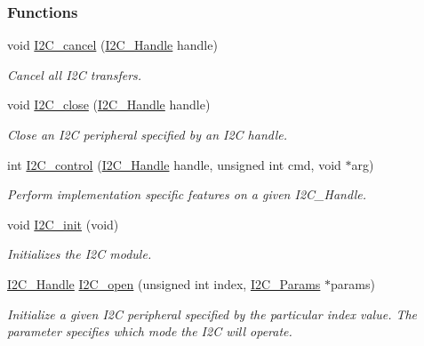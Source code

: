 \subsubsection*{Functions}
\begin{DoxyCompactItemize}
\item 
void \hyperlink{_i2_c_8h_a8cad0c04a9eca0fffc0ffe5586a5179b}{I2\+C\+\_\+cancel} (\hyperlink{_i2_c_8h_a5809a229f8395c87f59e63128195c1bf}{I2\+C\+\_\+\+Handle} handle)
\begin{DoxyCompactList}\small\item\em Cancel all I2\+C transfers. \end{DoxyCompactList}\item 
void \hyperlink{_i2_c_8h_a12c86d89a687f2ee1eb980d99c32326d}{I2\+C\+\_\+close} (\hyperlink{_i2_c_8h_a5809a229f8395c87f59e63128195c1bf}{I2\+C\+\_\+\+Handle} handle)
\begin{DoxyCompactList}\small\item\em Close an I2\+C peripheral specified by an I2\+C handle. \end{DoxyCompactList}\item 
int \hyperlink{_i2_c_8h_a633003582213a5098467a4e647cc52f9}{I2\+C\+\_\+control} (\hyperlink{_i2_c_8h_a5809a229f8395c87f59e63128195c1bf}{I2\+C\+\_\+\+Handle} handle, unsigned int cmd, void $\ast$arg)
\begin{DoxyCompactList}\small\item\em Perform implementation specific features on a given I2\+C\+\_\+\+Handle. \end{DoxyCompactList}\item 
void \hyperlink{_i2_c_8h_a9ff51ddf1d325776fef90cce0223772b}{I2\+C\+\_\+init} (void)
\begin{DoxyCompactList}\small\item\em Initializes the I2\+C module. \end{DoxyCompactList}\item 
\hyperlink{_i2_c_8h_a5809a229f8395c87f59e63128195c1bf}{I2\+C\+\_\+\+Handle} \hyperlink{_i2_c_8h_ae1aa99e1fee4517406018e10025cca0e}{I2\+C\+\_\+open} (unsigned int index, \hyperlink{struct_i2_c___params}{I2\+C\+\_\+\+Params} $\ast$params)
\begin{DoxyCompactList}\small\item\em Initialize a given I2\+C peripheral specified by the particular index value. The parameter specifies which mode the I2\+C will operate. \end{DoxyCompactList}\item 

\end{DoxyCompactItemize}
